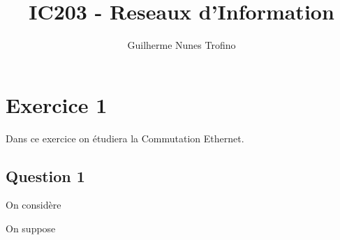 \documentclass{article}
\title{IC203 - Reseaux d'Information}
\author{Guilherme Nunes Trofino}
\begin{document}
\maketitle
\setlength{\parindent}{0pt}



\section*{Exercice 1}
\noindent Dans ce exercice on étudiera la Commutation Ethernet.

\subsection*{Question 1}
\begin{exercise}
    On considère
\end{exercise}

\newpage
\begin{resolution}
    On suppose
\end{resolution}
\end{document}
